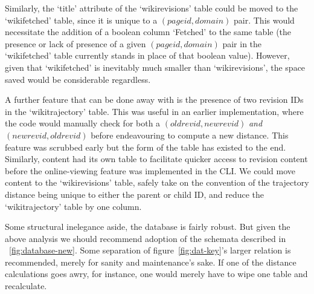 Similarly, the `title' attribute of the `wikirevisions' table could be
moved to the `wikifetched' table, since it is unique to a
$(pageid,domain)$ pair. This would necessitate the addition of a
boolean column `Fetched' to the same table (the presence or lack of
presence of a given $(pageid,domain)$ pair in the `wikifetched' table
currently stands in place of that boolean value). However, given that
`wikifetched' is inevitably much smaller than `wikirevisions', the
space saved would be considerable regardless.

A further feature that can be done away with is the presence of two
revision IDs in the `wikitrajectory' table. This was useful in an
earlier implementation, where the code would manually check for both a
$(oldrevid,newrevid)$ \textit{and} $(newrevid,oldrevid)$ before
endeavouring to compute a new distance. This feature was scrubbed
early but the form of the table has existed to the end. Similarly,
content had its own table to facilitate quicker access to revision
content before the online-viewing feature was implemented in the
CLI. We could move content to the `wikirevisions' table, safely take
on the convention of the trajectory distance being unique to either
the parent or child ID, and reduce the `wikitrajectory' table by one
column.

Some structural inelegance aside, the database is fairly robust. But
given the above analysis we should recommend adoption of the schemata
described in ~\ref{fig:database-new}. Some separation of
figure~\ref{fig:dat-key}'s larger relation is recommended, merely for
sanity and maintenance's sake. If one of the distance calculations
goes awry, for instance, one would merely have to wipe one table and
recalculate.

